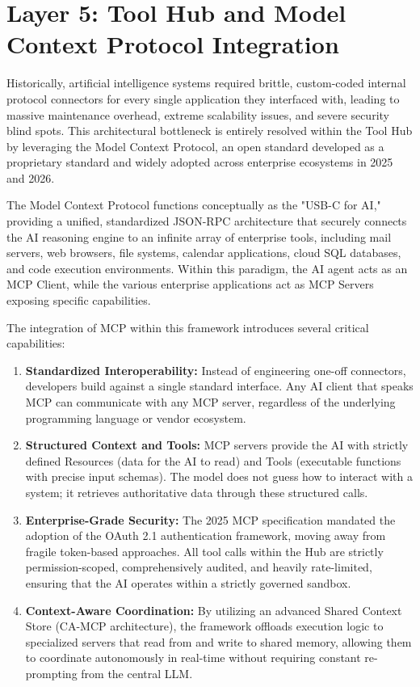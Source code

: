 \documentclass[12pt, a4paper]{report}
\begin{document}
\section{Layer 5: Tool Hub and Model Context Protocol Integration}
Historically, artificial intelligence systems required brittle, custom-coded internal protocol connectors for every single application they interfaced with, leading to massive maintenance overhead, extreme scalability issues, and severe security blind spots.\cite{redpilllabs2026} This architectural bottleneck is entirely resolved within the Tool Hub by leveraging the Model Context Protocol, an open standard developed as a proprietary standard and widely adopted across enterprise ecosystems in 2025 and 2026.\cite{hojo2025}

The Model Context Protocol functions conceptually as the "USB-C for AI," providing a unified, standardized JSON-RPC architecture that securely connects the AI reasoning engine to an infinite array of enterprise tools, including mail servers, web browsers, file systems, calendar applications, cloud SQL databases, and code execution environments.\cite{hojo2025} Within this paradigm, the AI agent acts as an MCP Client, while the various enterprise applications act as MCP Servers exposing specific capabilities.\cite{linnify2026}

The integration of MCP within this framework introduces several critical capabilities:
\begin{enumerate}
    \item \textbf{Standardized Interoperability:} Instead of engineering one-off connectors, developers build against a single standard interface. Any AI client that speaks MCP can communicate with any MCP server, regardless of the underlying programming language or vendor ecosystem.\cite{gpttrainer2026}
    \item \textbf{Structured Context and Tools:} MCP servers provide the AI with strictly defined Resources (data for the AI to read) and Tools (executable functions with precise input schemas).\cite{redpilllabs2026} The model does not guess how to interact with a system; it retrieves authoritative data through these structured calls.\cite{redpilllabs2026}
    \item \textbf{Enterprise-Grade Security:} The 2025 MCP specification mandated the adoption of the OAuth 2.1 authentication framework, moving away from fragile token-based approaches.\cite{devto2026} All tool calls within the Hub are strictly permission-scoped, comprehensively audited, and heavily rate-limited, ensuring that the AI operates within a strictly governed sandbox.\cite{hojo2025}
    \item \textbf{Context-Aware Coordination:} By utilizing an advanced Shared Context Store (CA-MCP architecture), the framework offloads execution logic to specialized servers that read from and write to shared memory, allowing them to coordinate autonomously in real-time without requiring constant re-prompting from the central LLM.\cite{arxiv2601}
\end{enumerate}
\end{document}
